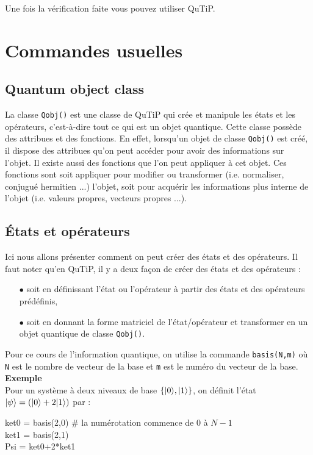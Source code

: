 Une fois la vérification faite vous pouvez utiliser QuTiP.

\section{Commandes usuelles}

\subsection{Quantum object class}
La classe \texttt{Qobj()} est une classe de QuTiP qui crée et manipule les états et les opérateurs, c'est-à-dire tout ce qui est un objet quantique. Cette classe possède des attribues et des fonctions. En effet, lorsqu'un objet de classe \texttt{Qobj()} est créé, il dispose des attribues qu'on peut accéder pour avoir des informations sur l'objet. Il existe aussi des fonctions que l'on peut appliquer à cet objet. Ces fonctions sont soit appliquer pour modifier ou transformer (i.e. normaliser, conjugué hermitien ...) l'objet, soit pour acquérir les informations plus interne de l'objet (i.e. valeurs propres, vecteurs propres ...).

\subsection{États et opérateurs}
Ici nous allons présenter comment on peut créer des états et des opérateurs. Il faut noter qu'en QuTiP, il y a deux façon de créer des états et des opérateurs :
\begin{itemize}
\item[$\bullet$] soit en définissant l'état ou l'opérateur à partir des états et des opérateurs prédéfinis,
\item[$\bullet$] soit en donnant la forme matriciel de l'état/opérateur et transformer en un objet quantique de classe \texttt{Qobj()}.
\end{itemize}

Pour ce cours de l'information quantique, on utilise la commande \texttt{basis(N,m)} où \texttt{N} est le nombre de vecteur de la base et \texttt{m} est le numéro du vecteur de la base.\\
\textbf{Exemple}\\
Pour un système à deux niveaux de base $\{\vert0\rangle,\vert1\rangle\}$, on définit l'état $\vert\psi\rangle=(\vert0\rangle+2\vert1\rangle)$ par :\\
\begin{tt}
ket0 = basis(2,0) \# la numérotation commence de $0$ à $N-1$\\
ket1 = basis(2,1) \\
Psi = ket0+2*ket1
\end{tt}

